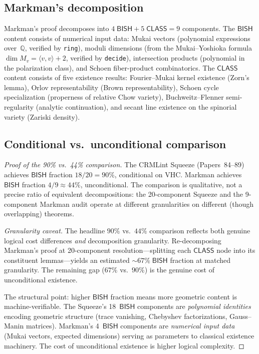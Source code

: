 \documentclass[11pt]{article}
\theoremstyle{plain}
\theoremstyle{definition}
\theoremstyle{remark}
\newcommand{\QQ}{\mathbb{Q}}
\newcommand{\BISH}{\mathsf{BISH}}
\newcommand{\CLASS}{\mathsf{CLASS}}
\begin{document}
\subsection{Markman's decomposition}

Markman's proof decomposes into $4\;\BISH + 5\;\CLASS = 9$ components.  The $\BISH$ content consists of numerical input data: Mukai vectors (polynomial expressions over~$\QQ$, verified by \texttt{ring}), moduli dimensions (from the Mukai--Yoshioka formula $\dim M_v = \langle v, v \rangle + 2$, verified by \texttt{decide}), intersection products (polynomial in the polarization class), and Schoen fiber-product combinatorics.  The $\CLASS$ content consists of five existence results: Fourier--Mukai kernel existence (Zorn's lemma), Orlov representability (Brown representability), Schoen cycle specialization (properness of relative Chow variety), Buchweitz--Flenner semi-regularity (analytic continuation), and secant line existence on the spinorial variety (Zariski density).

\subsection{Conditional vs.\ unconditional comparison}

\begin{proof}[Proof of the 90\% vs.\ 44\% comparison]
The CRMLint Squeeze (Papers~84--89) achieves $\BISH$ fraction $18/20 = 90\%$, conditional on VHC.  Markman achieves $\BISH$ fraction $4/9 \approx 44\%$, unconditional.  The comparison is qualitative, not a precise ratio of equivalent decompositions: the 20-component Squeeze and the 9-component Markman audit operate at different granularities on different (though overlapping) theorems.

\emph{Granularity caveat.}  The headline $90\%$ vs.\ $44\%$ comparison reflects both genuine logical cost differences \emph{and} decomposition granularity.  Re-decomposing Markman's proof at 20-component resolution---splitting each $\CLASS$ node into its constituent lemmas---yields an estimated ${\sim}67\%\;\BISH$ fraction at matched granularity.  The remaining gap ($67\%$ vs.\ $90\%$) is the genuine cost of unconditional existence.

The structural point: higher $\BISH$ fraction means more geometric content is machine-verifiable.  The Squeeze's 18~$\BISH$ components are \emph{polynomial identities} encoding geometric structure (trace vanishing, Chebyshev factorizations, Gauss--Manin matrices).  Markman's 4~$\BISH$ components are \emph{numerical input data} (Mukai vectors, expected dimensions) serving as parameters to classical existence machinery.  The cost of unconditional existence is higher logical complexity.
\end{proof}
\end{document}
